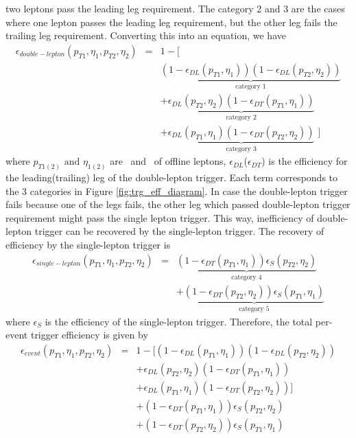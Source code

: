 two leptons pass the leading leg requirement. The category 2 and 3 are the cases where one 
lepton passes the leading leg requirement, but the other leg fails the trailing leg 
requirement. Converting this into an equation, we have 
\begin{eqnarray} 
\label{eq:doubletrgeff}
\epsilon_{double-lepton} \left( p_{T1},\eta_1,p_{T2},\eta_2 \right)
&=&    
1 - \Big[   \\ 
& & 
\underbrace{
\left(1 - \epsilon_{DL}\left(p_{T1}, \eta_1\right)\right)
\left(1 - \epsilon_{DL}\left(p_{T2}, \eta_2\right)\right)  
}_\text{category 1} \\
& & 
+ \underbrace{
\epsilon_{DL}\left(p_{T2}, \eta_2\right)\left(1 - \epsilon_{DT}\left(p_{T1}, \eta_1\right)\right)
}_\text{category 2} \\
& &
+ \underbrace{
\epsilon_{DL}\left(p_{T1}, \eta_1\right)\left(1 - \epsilon_{DT}\left(p_{T2}, \eta_2\right)\right) 
}_\text{category 3}
\,\, \Big]
\end{eqnarray} 
where $p_{T1(2)} \textrm{ and } \eta_{1(2)}$ are \pt~and \Eta~of offline leptons, 
$\epsilon_{DL}$($\epsilon_{DT}$) is the efficiency for the leading(trailing) leg 
of the double-lepton trigger. 
Each term corresponds to the 3 categories in Figure \ref{fig:trg_eff_diagram}.
In case the double-lepton trigger fails because one of the legs fails, the other leg 
which passed double-lepton trigger requirement might pass the single lepton trigger. 
This way, inefficiency of double-lepton trigger can be recovered by the single-lepton trigger.
The recovery of efficiency by the single-lepton trigger is  
\begin{eqnarray} 
\label{eq:singletrgeff}
\epsilon_{single-lepton} \left( p_{T1},\eta_1,p_{T2},\eta_2 \right)
&=&    
\underbrace{
\left(1 - \epsilon_{DT}\left(p_{T1}, \eta_1\right)\right)
\epsilon_{S}\left(p_{T2}, \eta_2\right)  
}_\text{category 4} \\
& & 
+ \underbrace{
\left(1 - \epsilon_{DT}\left(p_{T2}, \eta_2\right)\right)
\epsilon_{S}\left(p_{T1}, \eta_1\right)  
}_\text{category 5} 
\end{eqnarray}
where $\epsilon_{S}$ is the efficiency of the single-lepton trigger. 
Therefore, the total per-event trigger efficiency is given by 
\begin{eqnarray} 
\label{eq:doubletrgeff}
\epsilon_{event} \left( p_{T1},\eta_1,p_{T2},\eta_2 \right)
&=&    
1 - \Big[    
\left(1 - \epsilon_{DL}\left(p_{T1}, \eta_1\right)\right)
\left(1 - \epsilon_{DL}\left(p_{T2}, \eta_2\right)\right)  \\ 
& & 
+ \epsilon_{DL}\left(p_{T2}, \eta_2\right)\left(1 - \epsilon_{DT}\left(p_{T1}, \eta_1\right)\right) \\
& &
+ \epsilon_{DL}\left(p_{T1}, \eta_1\right)\left(1 - \epsilon_{DT}\left(p_{T2}, \eta_2\right)\right)  
\Big] \\
& &
+ \left(1 - \epsilon_{DT}\left(p_{T1}, \eta_1\right)\right)
\epsilon_{S}\left(p_{T2}, \eta_2\right)  \\ 
& & 
+ \left(1 - \epsilon_{DT}\left(p_{T2}, \eta_2\right)\right)
\epsilon_{S}\left(p_{T1}, \eta_1\right)  
\end{eqnarray} 

